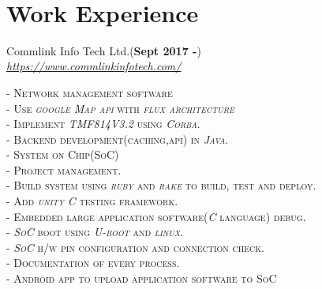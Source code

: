 \documentclass[10pt]{article} %
\newcommand\tab[1][1cm]{\hspace*{#1}}
\begin{document}
\color{text1} %


\par{\\ %



\begin{minipage}[t]{0.5\textwidth} %
\vspace{0pt} %
	

\section{Work Experience} 


{{\raggedright\large Commlink Info Tech Ltd.(\textbf{Sept 2017 -}) \\
\textit{\href {https://www.commlinkinfotech.com/}{https://www.commlinkinfotech.com/}}\\
}}
	 \textsc{- Network management software}\\
	 	\tab \textsc{- Use \textit{google Map api} with \textit{flux architecture}}\\
	 	\tab \textsc{- Implement \textit{TMF814V3.2} using \textit{Corba}.}\\
	 	\tab \textsc{- Backend development(caching,api) in \textit{Java}.}\\
	 \textsc{- System on Chip(SoC) }\\
	 	\tab \textsc{- Project management.}\\
	 	\tab \textsc{- Build system using \textit{ruby} and \textit{rake} to build, test and deploy.}\\
	 	\tab \textsc{- Add \textit{unity} \textit{C} testing framework.}\\
	 	\tab \textsc{- Embedded large application software(\textit{C} language) debug.}\\
	 	\tab \textsc{- \textit{SoC} boot using \textit{U-boot} and \textit{linux}.}\\
	 	\tab \textsc{- \textit{SoC} h/w pin configuration and connection check.}\\
	 	\tab \textsc{- Documentation of every process.}\\
	 	\tab \textsc{- Android app to upload application software to SoC}\\



\end{minipage}}
\end{document}
